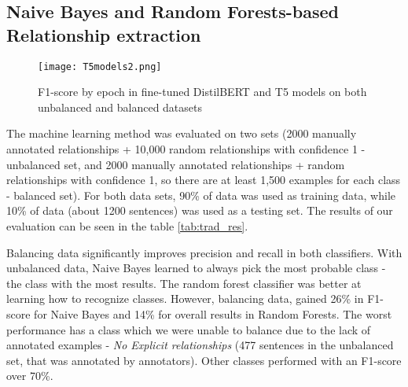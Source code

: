 \documentclass[final,12pt,3p,times,twocolumn,authoryear]{elsarticle}
\begin{document}
\subsection{Naive Bayes and Random Forests-based Relationship extraction}


  \begin{figure*}[h]
\caption{F1-score by epoch in fine-tuned DistilBERT and T5 models on both unbalanced and balanced datasets }
\centering
\texttt{[image: T5models2.png]}
\label{fig:t5_epochs}
\end{figure*}
The machine learning method was evaluated on two sets (2000 manually annotated relationships + 10,000 random relationships with confidence 1 - unbalanced set, and 2000 manually annotated relationships + random relationships with confidence 1, so there are at least 1,500 examples for each class - balanced set). For both data sets, 90\% of data was used as training data, while 10\% of data (about 1200 sentences) was used as a testing set. The results of our evaluation can be seen in the table \ref{tab:trad_res}. 


 


Balancing data significantly improves precision and recall in both classifiers. With unbalanced data, Naive Bayes learned to always pick the most probable class - the class with the most results. The random forest classifier was better at learning how to recognize classes. However, balancing data, gained 26\% in F1-score for Naive Bayes and 14\% for overall results in Random Forests. The worst performance has a class which we were unable to balance due to the lack of annotated examples - \textit{No Explicit relationships} (477 sentences in the unbalanced set, that was annotated by annotators). Other classes performed with an F1-score over 70\%. 
\end{document}
